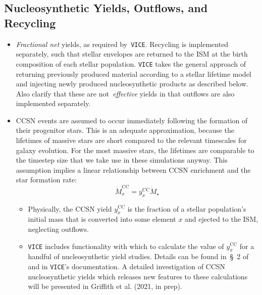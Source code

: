 \documentclass[fleqn, usenatbib]{mnras}
\begin{document}
\subsection{Nucleosynthetic Yields, Outflows, and Recycling}  
\label{sec:methods:yields} 
\begin{itemize} 

	\item \textit{Fractional net} yields, as required by~\texttt{VICE}. 
	Recycling is implemented separately, such that stellar envelopes are 
	returned to the ISM at the birth composition of each stellar population. 
	\texttt{VICE} takes the general approach of returning previously produced 
	material according to a stellar lifetime model and injecting newly 
	produced nucleosynthetic products as described below. Also clarify that 
	these are not~\textit{effective} yields in that outflows are also 
	implemented separately. 

	\item CCSN events are assumed to occur immediately following the formation 
	of their progenitor stars. This is an adequate approximation, because the 
	lifetimes of massive stars are short compared to the relevant timescales 
	for galaxy evolution. For the most massive stars, the lifetimes are 
	comparable to the timestep size that we take use in these simulations 
	anyway. This assumption implies a linear relationship between CCSN 
	enrichment and the star formation rate: 
	\begin{equation} 
	\dot{M}_x^\text{CC} = y_x^\text{CC}\dot{M}_\star 
	\end{equation} 
	\begin{itemize} 
		\item Physically, the CCSN yield $y_x^\text{CC}$ is the fraction of a 
		stellar population's initial mass that is converted into some element 
		$x$ and ejected to the ISM, neglecting outflows. 

		\item \texttt{VICE} includes functionality with which to calculate 
		the value of $y_x^\text{CC}$ for a handful of nucleosynthetic yield 
		studies. Details can be found in~\S~2 of~\citet{Johnson2020} and in 
		\texttt{VICE}'s documentation. A detailed investigation of 
		CCSN nucleosynthetic yields which releases new features to these 
		calculations will be presented in Griffith et al. (2021, in prep). 


\end{itemize}
\end{itemize}
\end{document}
